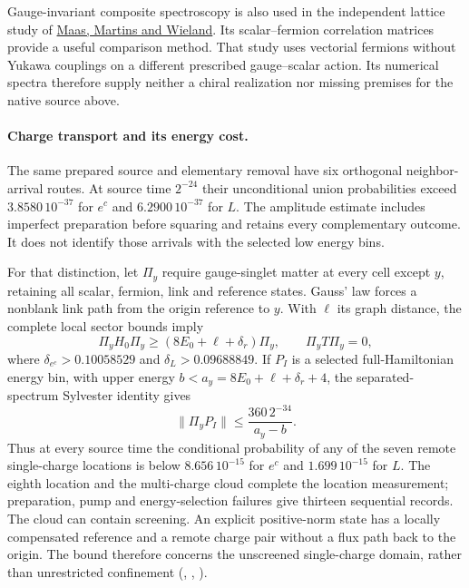 Gauge-invariant composite spectroscopy is also used in the independent
lattice study of \href{https://arxiv.org/abs/2610.33611}{Maas, Martins and
Wieland}. Its scalar--fermion correlation matrices provide a useful
comparison method. That study uses vectorial fermions without Yukawa
couplings on a different prescribed gauge--scalar action. Its numerical
spectra therefore supply neither a chiral realization nor missing
premises for the native source above.

\paragraph{Charge transport and its energy cost.}
The same prepared source and elementary removal have six orthogonal
neighbor-arrival routes. At source time $2^{-24}$ their unconditional
union probabilities exceed $3.8580\,10^{-37}$ for $e^c$ and
$6.2900\,10^{-37}$ for $L$. The amplitude estimate includes imperfect
preparation before squaring and retains every complementary outcome.
It does not identify those arrivals with the selected low energy bins.

For that distinction, let $\Pi_y$ require gauge-singlet matter at every
cell except $y$, retaining all scalar, fermion, link and reference states.
Gauss' law forces a nonblank link path from the origin reference to $y$.
With $\ell$ its graph distance, the complete local sector bounds imply
\[
 \Pi_y H_0\Pi_y\ge(8E_0+\ell+\delta_r)\Pi_y,
 \qquad \Pi_y T\Pi_y=0,
\]
where $\delta_{e^c}>0.10058529$ and $\delta_L>0.09688849$.
If $P_I$ is a selected full-Hamiltonian energy bin, with upper energy
$b<a_y=8E_0+\ell+\delta_r+4$, the separated-spectrum Sylvester identity
gives
\[
 \|\Pi_yP_I\|\le\frac{360\,2^{-34}}{a_y-b}.
\]
Thus at every source time the conditional probability of any of the
seven remote single-charge locations is below $8.656\,10^{-15}$ for
$e^c$ and $1.699\,10^{-15}$ for $L$. The eighth location and the
multi-charge cloud complete the location measurement; preparation,
pump and energy-selection failures give thirteen sequential records.
The cloud can contain screening. An explicit positive-norm state has a
locally compensated reference and a remote charge pair without a flux
path back to the origin. The bound therefore concerns the unscreened
single-charge domain, rather than unrestricted confinement
(,
,
\cite{ophrepo}).

